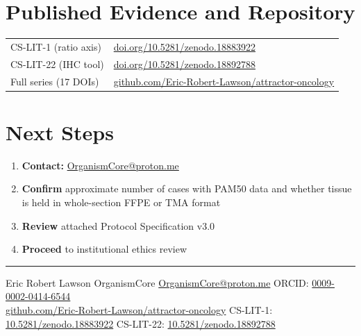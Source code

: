 \documentclass[11pt, a4paper]{article}
\begin{document}
\section{Published Evidence and Repository}

\begin{center}
\begin{tabular}{p{4cm}p{9cm}}
\toprule
CS-LIT-1 (ratio axis) &
\href{https://doi.org/10.5281/zenodo.18883922}
{doi.org/10.5281/zenodo.18883922} \\
CS-LIT-22 (IHC tool) &
\href{https://doi.org/10.5281/zenodo.18892788}
{doi.org/10.5281/zenodo.18892788} \\
Full series (17 DOIs) &
\href{https://github.com/Eric-Robert-Lawson/attractor-oncology}
{github.com/Eric-Robert-Lawson/attractor-oncology} \\
\bottomrule
\end{tabular}
\end{center}

\section{Next Steps}

\begin{enumerate}
    \item \textbf{Contact:}
    \href{mailto:OrganismCore@proton.me}
    {OrganismCore@proton.me}
    \item \textbf{Confirm} approximate number
    of cases with PAM50 data and whether
    tissue is held in whole-section FFPE
    or TMA format
    \item \textbf{Review} attached Protocol
    Specification v3.0
    \item \textbf{Proceed} to institutional
    ethics review
\end{enumerate}

\vspace{0.5em}
\noindent\rule{\textwidth}{0.4pt}
\vspace{0.3em}

\begin{center}
\small
Eric Robert Lawson \textbar{} OrganismCore
\textbar{}
\href{mailto:OrganismCore@proton.me}
{OrganismCore@proton.me} \textbar{}
ORCID:
\href{https://orcid.org/0009-0002-0414-6544}
{0009-0002-0414-6544}\\
\href{https://github.com/Eric-Robert-Lawson/attractor-oncology}
{github.com/Eric-Robert-Lawson/attractor-oncology}
\textbar{}
CS-LIT-1:
\href{https://doi.org/10.5281/zenodo.18883922}
{10.5281/zenodo.18883922}
\textbar{}
CS-LIT-22:
\href{https://doi.org/10.5281/zenodo.18892788}
{10.5281/zenodo.18892788}
\end{center}
\end{document}
